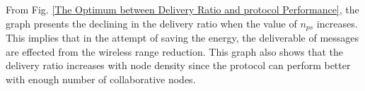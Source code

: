\documentclass[conference]{IEEEtran}
\begin{document}
From Fig. \ref{The Optimum between Delivery Ratio and protocol Performance}, the graph presents the declining in the delivery ratio when the value of $n_{ps}$ increases.
This implies that in the attempt of saving the energy, the deliverable of messages are effected from the wireless range reduction.
This graph also shows that the delivery ratio increases with node density since the protocol can perform better with enough number of collaborative nodes. 










\end{document}
